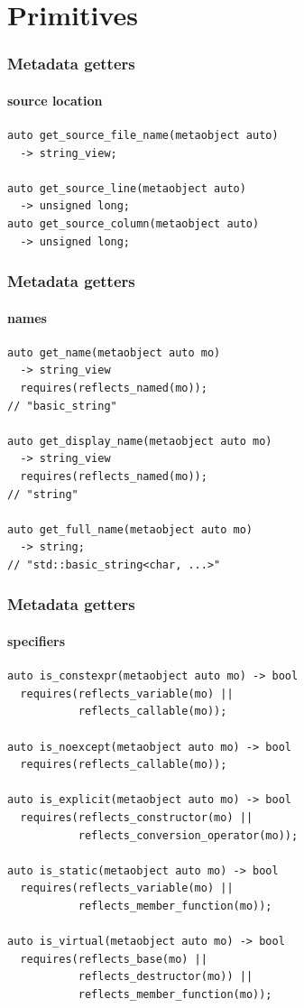 \documentclass[compress,table,xcolor=table]{beamer}
\begin{document}
\section{Primitives}
\begin{frame}[fragile]
  \frametitle{Metadata getters}
  \framesubtitle{source location}
  \begin{lstlisting}[language=c++2x]
auto get_source_file_name(metaobject auto)
  -> string_view;

auto get_source_line(metaobject auto)
  -> unsigned long;
auto get_source_column(metaobject auto)
  -> unsigned long;
  \end{lstlisting}
\end{frame}
\begin{frame}[fragile]
  \frametitle{Metadata getters}
  \framesubtitle{names}
  \begin{lstlisting}[language=c++2x]
auto get_name(metaobject auto mo)
  -> string_view
  requires(reflects_named(mo));
// "basic_string"

auto get_display_name(metaobject auto mo)
  -> string_view
  requires(reflects_named(mo));
// "string"

auto get_full_name(metaobject auto mo)
  -> string;
// "std::basic_string<char, ...>"
  \end{lstlisting}
\end{frame}
\begin{frame}[fragile]
  \frametitle{Metadata getters}
  \framesubtitle{specifiers}
  \begin{lstlisting}[language=c++2x,basicstyle=\footnotesize\ttfamily]
auto is_constexpr(metaobject auto mo) -> bool
  requires(reflects_variable(mo) ||
           reflects_callable(mo));

auto is_noexcept(metaobject auto mo) -> bool
  requires(reflects_callable(mo));

auto is_explicit(metaobject auto mo) -> bool
  requires(reflects_constructor(mo) ||
           reflects_conversion_operator(mo));

auto is_static(metaobject auto mo) -> bool
  requires(reflects_variable(mo) ||
           reflects_member_function(mo));

auto is_virtual(metaobject auto mo) -> bool
  requires(reflects_base(mo) ||
           reflects_destructor(mo)) ||
           reflects_member_function(mo));
  \end{lstlisting}
\end{frame}
\end{document}
